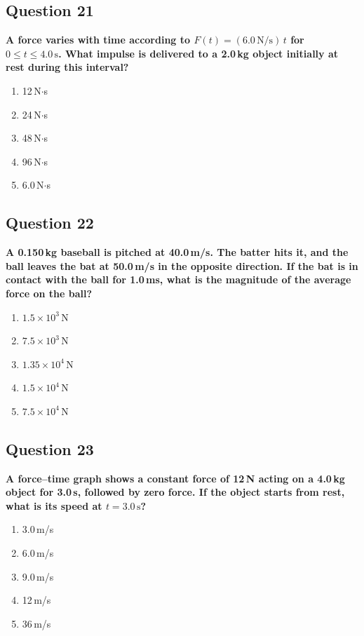 \documentclass[12pt,letterpaper]{article}
\begin{document}
\subsection{Question 21}

\begin{questionbox}
\textbf{A force varies with time according to $F(t) = (6.0\,\text{N/s})\,t$ for $0 \leq t \leq 4.0\,\text{s}$. What impulse is delivered to a 2.0\,kg object initially at rest during this interval?}

\begin{enumerate}[label=\alph*)]
    \item 12\,N$\cdot$s
    \item 24\,N$\cdot$s
    \item 48\,N$\cdot$s
    \item 96\,N$\cdot$s
    \item 6.0\,N$\cdot$s
\end{enumerate}
\end{questionbox}

\subsection{Question 22}

\begin{questionbox}
\textbf{A 0.150\,kg baseball is pitched at 40.0\,m/s. The batter hits it, and the ball leaves the bat at 50.0\,m/s in the opposite direction. If the bat is in contact with the ball for 1.0\,ms, what is the magnitude of the average force on the ball?}

\begin{enumerate}[label=\alph*)]
    \item $1.5 \times 10^3\,\text{N}$
    \item $7.5 \times 10^3\,\text{N}$
    \item $1.35 \times 10^4\,\text{N}$
    \item $1.5 \times 10^4\,\text{N}$
    \item $7.5 \times 10^4\,\text{N}$
\end{enumerate}
\end{questionbox}

\subsection{Question 23}

\begin{questionbox}
\textbf{A force--time graph shows a constant force of 12\,N acting on a 4.0\,kg object for 3.0\,s, followed by zero force. If the object starts from rest, what is its speed at $t = 3.0\,\text{s}$?}

\begin{enumerate}[label=\alph*)]
    \item 3.0\,m/s
    \item 6.0\,m/s
    \item 9.0\,m/s
    \item 12\,m/s
    \item 36\,m/s
\end{enumerate}
\end{questionbox}
\end{document}
